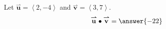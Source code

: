 \documentclass{ximera}
\author{Gregory Hartman \and Matthew Carr}
\begin{document}
\begin{exercise}
Let $\overset{\boldsymbol{\rightharpoonup}}{\mathbf{u}} = \left< 2,-4 \right>$ and $\overset{\boldsymbol{\rightharpoonup}}{\mathbf{v}} =  \left< 3,7 \right>$.
\[
\overset{\boldsymbol{\rightharpoonup}}{\mathbf{u}}\bullet \overset{\boldsymbol{\rightharpoonup}}{\mathbf{v}} = \answer{-22}
\]
\end{exercise}
\end{document}
